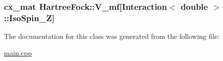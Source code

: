 \hypertarget{class_hartree_fock_a0362bdcdbf5969097be8c03576639e53}{
\subsubsection[{V\-\_\-mf}]{\setlength{\rightskip}{0pt plus 5cm}cx\-\_\-mat Hartree\-Fock\-::\-V\-\_\-mf\mbox{[}{\bf Interaction}$<$ double $>$\-::Iso\-Spin\-\_\-\-Z\mbox{]}\hspace{0.3cm}{\ttfamily [private]}}}\label{class_hartree_fock_a0362bdcdbf5969097be8c03576639e53}


The documentation for this class was generated from the following file\-:\begin{DoxyCompactItemize}
\item 
\hyperlink{main_8cpp}{main.\-cpp}\end{DoxyCompactItemize}
